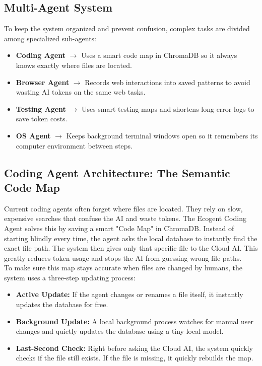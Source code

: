 \subsection{Multi-Agent System}
To keep the system organized and prevent confusion, complex tasks are divided among specialized sub-agents:
\begin{itemize}
    \item \textbf{Coding Agent} $\rightarrow$ Uses a smart code map in ChromaDB so it always knows exactly where files are located.
    \item \textbf{Browser Agent} $\rightarrow$ Records web interactions into saved patterns to avoid wasting AI tokens on the same web tasks.
    \item \textbf{Testing Agent} $\rightarrow$ Uses smart testing maps and shortens long error logs to save token costs.
    \item \textbf{OS Agent} $\rightarrow$ Keeps background terminal windows open so it remembers its computer environment between steps.
\end{itemize}

\subsection{Coding Agent Architecture: The Semantic Code Map}
Current coding agents often forget where files are located. They rely on slow, expensive searches that confuse the AI and waste tokens. The Ecogent Coding Agent solves this by saving a smart "Code Map" in ChromaDB. Instead of starting blindly every time, the agent asks the local database to instantly find the exact file path. The system then gives only that specific file to the Cloud AI. This greatly reduces token usage and stops the AI from guessing wrong file paths.\\

To make sure this map stays accurate when files are changed by humans, the system uses a three-step updating process:
\begin{itemize}
    \item \textbf{Active Update:} If the agent changes or renames a file itself, it instantly updates the database for free.
    \item \textbf{Background Update:} A local background process watches for manual user changes and quietly updates the database using a tiny local model.
    \item \textbf{Last-Second Check:} Right before asking the Cloud AI, the system quickly checks if the file still exists. If the file is missing, it quickly rebuilds the map.
\end{itemize}

